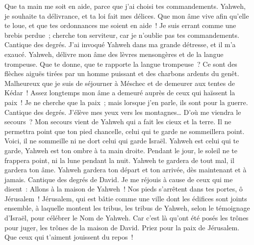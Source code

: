 \begin{multicols}{2}
Que ta main me soit en aide, parce que j'ai choisi tes commandements.
Yahweh, je souhaite ta délivrance, et ta loi fait mes délices.
Que mon âme vive afin qu'elle te loue, et que tes ordonnances me soient en aide~!
Je suis errant comme une brebis perdue~; cherche ton serviteur, car je n'oublie pas tes commandements.
\VerseOne{}Cantique des degrés. J'ai invoqué Yahweh dans ma grande détresse, et il m'a exaucé.
Yahweh, délivre mon âme des lèvres mensongères et de la langue trompeuse.
Que te donne, que te rapporte la langue trompeuse~?
Ce sont des flèches aiguës tirées par un homme puissant et des charbons ardents du genêt.
Malheureux que je suis de séjourner à Méschec et de demeurer aux tentes de Kédar~!
Assez longtemps mon âme a demeuré auprès de ceux qui haïssent la paix~!
Je ne cherche que la paix~; mais lorsque j'en parle, ils sont pour la guerre.
\VerseOne{}Cantique des degrés. J'élève mes yeux vers les montagnes… D'où me viendra le secours~?
Mon secours vient de Yahweh qui a fait les cieux et la terre.
Il ne permettra point que ton pied chancelle, celui qui te garde ne sommeillera point.
Voici, il ne sommeille ni ne dort celui qui garde Israël.
Yahweh est celui qui te garde, Yahweh est ton ombre à ta main droite.
Pendant le jour, le soleil ne te frappera point, ni la lune pendant la nuit.
Yahweh te gardera de tout mal, il gardera ton âme.
Yahweh gardera ton départ et ton arrivée, dès maintenant et à jamais.
\VerseOne{}Cantique des degrés de David. Je me réjouis à cause de ceux qui me disent~: Allons à la maison de Yahweh~!
Nos pieds s'arrêtent dans tes portes, ô Jérusalem~!
Jérusalem, qui est bâtie comme une ville dont les édifices sont joints ensemble,
à laquelle montent les tribus, les tribus de Yahweh, selon le témoignage d'Israël, pour célébrer le Nom de Yahweh.
Car c'est là qu'ont été posés les trônes pour juger, les trônes de la maison de David.
Priez pour la paix de Jérusalem. Que ceux qui t'aiment jouissent du repos~!

\end{multicols}
